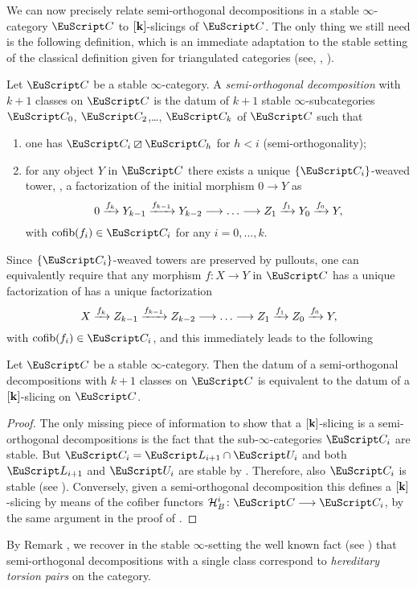  
We can now precisely relate semi-orthogonal decompositions in a stable $\infty$-category $\C$ to $[\mathbf{k}]$-slicings of $\C$. The only thing we still need is the following definition, which is an immediate adaptation to the stable setting of the classical definition given for triangulated categories (see, \eg, \cite{Bondal1995, Kuz} ).
\begin{definition}
Let $\C$ be a stable $\infty$-category. A \emph{semi-orthogonal decomposition} with $k+1$ classes on $\C$ is the datum of $k+1$ stable $\infty$-subcategories $\C_0$, $\C_2$,\dots, $\C_{k}$ of $\C$ such that
\begin{enumerate}
\item one has $\C_i\orth \C_h$ for $h<i$ (semi-orthogonality);
\item for any object $Y$ in $\C$ there exists a unique $\{\C_i\}$-weaved tower, \ie, a factorization of the initial morphism $0\to Y$ as 
\[
0 \xto{f_{k}} Y_{k-1} \xto{f_{k-1}}Y_{{k-2}}\to\dots\to Z_{{1}} \xto{f_1} Y_{0} \xto{f_0} Y,
\]
with $\cofib(f_i)\in \C_i$ for any $i=0,\dots, k$. 
\end{enumerate} 
\end{definition}
Since $\{\C_i\}$-weaved towers are preserved by pullouts, one can equivalently require that any morphism $f\colon X\to Y$ in $\C$ has a unique factorization of has a unique factorization
\[
X \xto{f_{k}} Z_{k-1} \xto{f_{k-1}}Z_{{k-2}}\to\dots\to Z_{{1}} \xto{f_1} Z_{0} \xto{f_0} Y,
\]
with $\cofib(f_i)\in \C_i$, and this immediately leads to the following 
\begin{proposition}\label{what.s.semiortho}
Let $\C$ be a stable $\infty$-category. Then the datum of a semi-orthogonal decompositions with $k+1$ classes on $\C$ is equivalent to the datum of a $[\mathbf{k}]$-slicing on $\C$.
\end{proposition}
\begin{proof}
The only missing piece of information to show that a $[\mathbf{k}]$-slicing is a semi-orthogonal decompositions is the fact that the sub-$\infty$-categories $\C_i$ are stable. But $\C_i=\cate{L}_{i+1}\cap \cate{U}_i$ and both $\cate{L}_{i+1}$ and $\cate{U}_i$ are stable by \aprop{}. Therefore, also $\C_i$ is stable (see \cite{LurieHA}).  Conversely, given a semi-orthogonal decomposition this defines a $[\mathbf{k}]$-slicing by means of the cofiber functors $\mathcal{H}^i_B\colon \C\to \C_i$, by the same argument in the proof of \aprop{}. 
\end{proof}
\begin{remark}By Remark , we recover in the stable $\infty$-setting the well known fact (see \cite[\textbf{IV.4}]{Beligiannisreiten}) that semi-orthogonal decompositions with a single class correspond to \emph{hereditary torsion pairs} on the category.
\end{remark}
